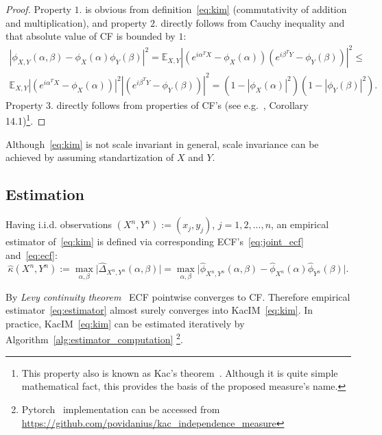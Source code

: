 \documentclass{article}
\begin{document}
\begin{proof}
	Property $\textit{1.}$ is obvious from definition~\eqref{eq:kim} (commutativity of addition and multiplication), and property $\textit{2.}$ directly follows from Cauchy inequality and that absolute value of CF is bounded by $1$:
	\begin{multline*}
	|\phi_{X,Y}(\alpha, \beta)  -\phi_{X}(\alpha) \phi_{Y}(\beta)|^{2} =
	\mathbb{E}_{X,Y} |( e^{i\alpha^{T}X} - \phi_{X}(\alpha) )(e^{i\beta^{T}Y}- \phi_{Y}(\beta) )|^{2} \leq \\
	\mathbb{E}_{X,Y} |( e^{i\alpha^{T}X} - \phi_{X}(\alpha) )|^{2} |(e^{i\beta^{T}Y}- \phi_{Y}(\beta) )|^{2}  = (1 - |\phi_{X}(\alpha)|^{2}) (1 - |\phi_{Y}(\beta)|^{2}).
	\end{multline*}
	Property $\textit{3.}$ directly follows from properties of CF's (see e.g.~\cite{Jacod}, Corollary 14.1)\footnote{This property also is known as Kac's theorem~\cite{KacTheorem}. Although it is quite simple mathematical fact, this provides the basis of the proposed measure's name.}.	
\end{proof}

Although~\eqref{eq:kim} is not scale invariant in general, scale invariance can be achieved by assuming standartization of $X$ and $Y$.


\subsection{Estimation}

Having i.i.d. observations $(X^{n},Y^{n}) := (x_{j}, y_{j})$, $j = 1,2,...,n$, an empirical estimator of~\eqref{eq:kim} is defined via corresponding ECF's~\eqref{eq:joint_ecf} and~\eqref{eq:ecf}:
\begin{equation}
\label{eq:estimator}
\widehat{\kappa}(X^{n},Y^{n}) := \max_{\alpha, \beta} \vert \hat{\Delta}_{X^{n},Y^{n}}(\alpha, \beta) \vert =\max_{\alpha, \beta} \vert \hat{\phi}_{X^{n},Y^{n}}(\alpha,\beta)  - \hat{\phi}_{X^{n}}(\alpha) \hat{\phi}_{Y^{n}}(\beta) \vert.
\end{equation}

\noindent By \textit{Levy continuity theorem}~\cite{KacTheorem} ECF pointwise converges to CF. Therefore empirical estimator~\eqref{eq:estimator} almost surely converges into KacIM~\eqref{eq:kim}. In practice, KacIM~\eqref{eq:kim} can be estimated iteratively by Algorithm~\ref{alg:estimator_computation} \footnote{Pytorch~\cite{NEURIPS2019_9015} implementation can be accessed from \url{https://github.com/povidanius/kac_independence_measure}}. 
\end{document}
